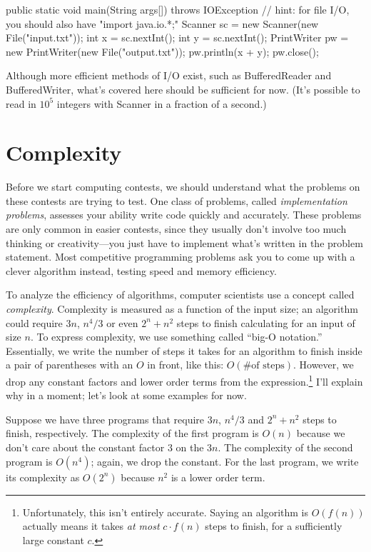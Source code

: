 \begin{mylstlisting}
public static void main(String args[]) throws IOException {
  // hint: for file I/O, you should also have "import java.io.*;"
  Scanner sc = new Scanner(new File("input.txt"));
  int x = sc.nextInt();
  int y = sc.nextInt();
  PrintWriter pw = new PrintWriter(new File("output.txt"));
  pw.println(x + y);
  pw.close();
}
\end{mylstlisting}

Although more efficient methods of I/O exist, such as BufferedReader and BufferedWriter, what's covered here should be sufficient for now. (It's possible to read in $10^5$ integers with Scanner in a fraction of a second.)

\section{Complexity}

Before we start computing contests, we should understand what the problems on these contests are trying to test. One class of problems, called \emph{implementation problems}, assesses your ability write code quickly and accurately. These problems are only common in easier contests, since they usually don't involve too much thinking or creativity---you just have to implement what's written in the problem statement. Most competitive programming problems ask you to come up with a clever algorithm instead, testing speed and memory efficiency.

To analyze the efficiency of algorithms, computer scientists use a concept called \emph{complexity}. Complexity is measured as a function of the input size; an algorithm could require $3n$, $n^4/3$ or even $2^n + n^2$ steps to finish calculating for an input of size $n$. To express complexity, we use something called ``big-O notation.'' Essentially, we write the number of steps it takes for an algorithm to finish inside a pair of parentheses with an $O$ in front, like this: $O(\text{\# of steps})$. However, we drop any constant factors and lower order terms from the expression.\footnote{Unfortunately, this isn't entirely accurate. Saying an algorithm is $O(f(n))$ actually means it takes \emph{at most} $c\cdot f(n)$ steps to finish, for a sufficiently large constant $c$.} I'll explain why in a moment; let's look at some examples for now. 

Suppose we have three programs that require $3n$, $n^4/3$ and $2^n + n^2$ steps to finish, respectively. The complexity of the first program is $O(n)$ because we don't care about the constant factor $3$ on the $3n$. The complexity of the second program is $O(n^4)$; again, we drop the constant. For the last program, we write its complexity as $O(2^n)$ because $n^2$ is a lower order term.

